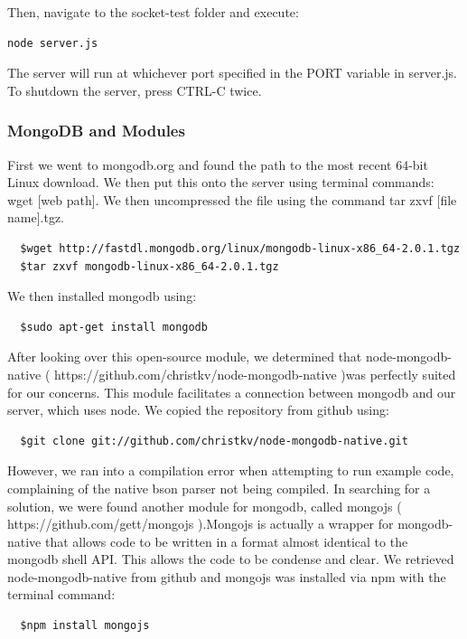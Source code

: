 \documentclass[letterpaper,12pt]{article}
\begin{document}
Then, navigate to the socket-test folder and execute:

\begin{verbatim}
node server.js
\end{verbatim}

The server will run at whichever port specified in the PORT variable in server.js. To shutdown the server, press CTRL-C twice.

\subsubsection{MongoDB and Modules}
First we went to mongodb.org and found the path to the most recent 64-bit Linux download. We then put this onto the server using terminal commands: wget [web path]. We then uncompressed the file using the command tar zxvf [file name].tgz.

\begin{verbatim}  
  $wget http://fastdl.mongodb.org/linux/mongodb-linux-x86_64-2.0.1.tgz
  $tar zxvf mongodb-linux-x86_64-2.0.1.tgz
\end{verbatim}

We then installed mongodb using: 

 \begin{verbatim}
  $sudo apt-get install mongodb
\end{verbatim}

After looking over this open-source module, we determined that node-mongodb-native ( https://github.com/christkv/node-mongodb-native )was perfectly suited for our concerns. This module facilitates a connection between mongodb and our server, which uses node. We copied the repository from github using:

\begin {verbatim}
  $git clone git://github.com/christkv/node-mongodb-native.git
\end{verbatim}

However, we ran into a compilation error when attempting to run example code, complaining of the native bson parser not being compiled.
In searching for a solution, we were found another module for mongodb, called mongojs ( https://github.com/gett/mongojs ).Mongojs is actually a wrapper for mongodb-native that allows code to be written in a format almost identical to the mongodb shell API. This allows the code to be condense and clear.
We retrieved node-mongodb-native from github and mongojs was installed via npm with the terminal command:

\begin {verbatim}
  $npm install mongojs
\end{verbatim}
\end{document}
